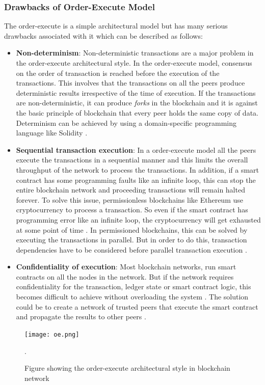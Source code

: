 \documentclass[
  a4paper,  %
  twoside,  %
  bibliography=totoc,
  headsepline,
  cleardoublepage=empty,
  parskip=half,
  draft=false
]{scrbook}
\begin{document}
\subsubsection{Drawbacks of Order-Execute Model}
The order-execute is a simple architectural model but has many serious drawbacks associated with it which can be described as follows:
\begin{itemize}
    \item \textbf{Non-determinism}: Non-deterministic transactions are a major problem in the order-execute architectural style. In the order-execute model, consensus on the order of transaction is reached before the execution of the transactions. This involves that the transactions on all the peers produce deterministic results irrespective of the time of execution. If the transactions are non-deterministic, it can produce \textit{forks} in the blockchain and it is against the basic principle of blockchain that every peer holds the same copy of data. Determinism can be achieved by using a domain-specific programming language like Solidity \cite{HF}. 
    \item \textbf{Sequential transaction execution}: In a order-execute model all the peers execute the transactions in a sequential manner and this limits the overall throughput of the network to process the transactions. In addition, if a smart contract has some programming faults like an infinite loop, this can stop the entire blockchain network and proceeding transactions will remain halted forever. To solve this issue, permissionless blockchains like Ethereum use cryptocurrency to process a transaction. So even if the smart contract has programming error like an infinite loop, the cryptocurrency will get exhausted at some point of time \cite{HF}. In permissioned blockchains, this can be solved by executing the transactions in parallel. But in order to do this, transaction dependencies have to be considered before parallel transaction execution \cite{HF}.
    \item \textbf{Confidentiality of execution}: Most blockchain networks, run smart contracts on all the nodes in the network. But if the network requires confidentiality for the transaction, ledger state or smart contract logic, this becomes difficult to achieve without overloading the system \cite{HF}. The solution could be to create a network of trusted peers that execute the smart contract and propagate the results to other peers \cite{HF}.
\end{itemize}

\begin{figure}[t!]
\begin{center}
\texttt{[image: oe.png]}
\caption{Figure showing the order-execute architectural style in blockchain network \cite{HF}}.
\label{fig:oe}
\end{center}
\end{figure}
\end{document}
